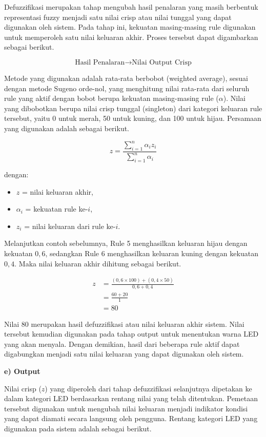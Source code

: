 \documentclass[12pt,a4paper]{article}
\begin{document}
Defuzzifikasi merupakan tahap mengubah hasil penalaran yang masih berbentuk representasi fuzzy menjadi satu nilai crisp atau nilai tunggal yang dapat digunakan oleh sistem. Pada tahap ini, kekuatan masing-masing rule digunakan untuk memperoleh satu nilai keluaran akhir. Proses tersebut dapat digambarkan sebagai berikut.

\[
\text{Hasil Penalaran}
\rightarrow
\text{Nilai Output Crisp}
\]

Metode yang digunakan adalah rata-rata berbobot (weighted average), sesuai dengan metode Sugeno orde-nol, yang menghitung nilai rata-rata dari seluruh rule yang aktif dengan bobot berupa kekuatan masing-masing rule ($\alpha$). Nilai yang dibobotkan berupa nilai crisp tunggal (singleton) dari kategori keluaran rule tersebut, yaitu 0 untuk merah, 50 untuk kuning, dan 100 untuk hijau. Persamaan yang digunakan adalah sebagai berikut.

\[
z=
\frac{\sum_{i=1}^{n}\alpha_i z_i}
{\sum_{i=1}^{n}\alpha_i}
\]

\begin{samepage}
dengan:
\begin{itemize}
    \item $z$ = nilai keluaran akhir,
    \item $\alpha_i$ = kekuatan rule ke-$i$,
    \item $z_i$ = nilai keluaran dari rule ke-$i$.
\end{itemize}
\end{samepage}

Melanjutkan contoh sebelumnya, Rule 5 menghasilkan keluaran hijau dengan kekuatan $0{,}6$, sedangkan Rule 6 menghasilkan keluaran kuning dengan kekuatan $0{,}4$. Maka nilai keluaran akhir dihitung sebagai berikut.

\begin{align}
z &=
\frac{(0{,}6 \times 100)+(0{,}4 \times 50)}
{0{,}6+0{,}4}
\\[4pt]
&=
\frac{60+20}{1}
\\[4pt]
&= 80
\end{align}

Nilai $80$ merupakan hasil defuzzifikasi atau nilai keluaran akhir sistem. Nilai tersebut kemudian digunakan pada tahap output untuk menentukan warna LED yang akan menyala. Dengan demikian, hasil dari beberapa rule aktif dapat digabungkan menjadi satu nilai keluaran yang dapat digunakan oleh sistem.

\textbf{e) Output}

Nilai crisp ($z$) yang diperoleh dari tahap defuzzifikasi selanjutnya dipetakan ke dalam kategori LED berdasarkan rentang nilai yang telah ditentukan. Pemetaan tersebut digunakan untuk mengubah nilai keluaran menjadi indikator kondisi yang dapat diamati secara langsung oleh pengguna. Rentang kategori LED yang digunakan pada sistem adalah sebagai berikut.
\end{document}

